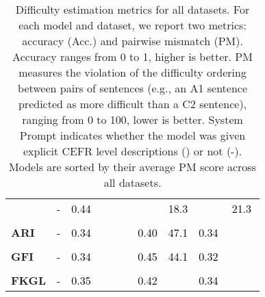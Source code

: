 \begin{table}[!h]
\begin{tabular}{lccccccc}
         & - & \cellcolor[HTML]{8ea5d2}\textcolor{black}{0.44} & \cellcolor[HTML]{224ea6}\textcolor{white}{86.4} & \cellcolor[HTML]{6382c0}\textcolor{white}{0.61} & \cellcolor[HTML]{d0d9ec}\textcolor{black}{18.3} & \cellcolor[HTML]{3059ac}\textcolor{white}{0.81} & \cellcolor[HTML]{c8d3e9}\textcolor{black}{21.3} \\
        \\[2pt]
        \textbf{ARI} & - & \cellcolor[HTML]{a8b9dc}\textcolor{black}{0.34} & \cellcolor[HTML]{003299}\textcolor{white}{111.6} & \cellcolor[HTML]{99add6}\textcolor{black}{0.40} & \cellcolor[HTML]{869ece}\textcolor{black}{47.1} & \cellcolor[HTML]{a8b9dc}\textcolor{black}{0.34} & \cellcolor[HTML]{1e4ba5}\textcolor{white}{88.2} \\
        \\[2pt]
        \textbf{GFI} & - & \cellcolor[HTML]{a8b9dc}\textcolor{black}{0.34} & \cellcolor[HTML]{003299}\textcolor{white}{112.6} & \cellcolor[HTML]{8ca3d1}\textcolor{black}{0.45} & \cellcolor[HTML]{8ea5d2}\textcolor{black}{44.1} & \cellcolor[HTML]{adbdde}\textcolor{black}{0.32} & \cellcolor[HTML]{003299}\textcolor{white}{102.0} \\
        \\[2pt]
        \textbf{FKGL} & - & \cellcolor[HTML]{a5b7db}\textcolor{black}{0.35} & \cellcolor[HTML]{003299}\textcolor{white}{112.4} & \cellcolor[HTML]{93a9d4}\textcolor{black}{0.42} & \cellcolor[HTML]{748fc7}\textcolor{white}{54.5} & \cellcolor[HTML]{a8b9dc}\textcolor{black}{0.34} & \cellcolor[HTML]{013499}\textcolor{white}{99.3} \\
        \bottomrule
    \end{tabular}
    \caption{Difficulty estimation metrics for all datasets. For each model and dataset, we report two metrics: accuracy (Acc.) and pairwise mismatch (PM). Accuracy ranges from 0 to 1, higher is better. PM measures the violation of the difficulty ordering between pairs of sentences (e.g., an A1 sentence predicted as more difficult than a C2 sentence), ranging from 0 to 100, lower is better. System Prompt indicates whether the model was given explicit CEFR level descriptions (\checkmark) or not (-). Models are sorted by their average PM score across all datasets.}
    \label{tab:difficulty_estimation_metrics}
\end{table}

